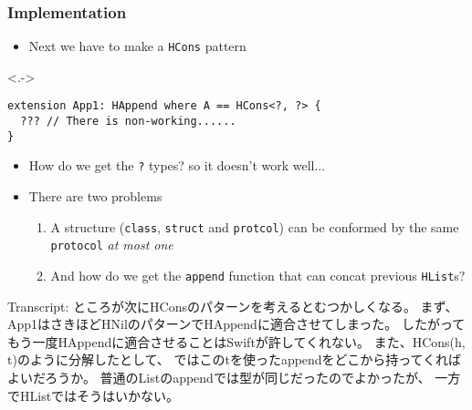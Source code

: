\begin{frame}[fragile]
  \frametitle{Implementation}

  \begin{itemize}
    \item<+-> Next we have to make a \lstinline|HCons| pattern
  \end{itemize}

  \begin{uncoverenv}<.->
\begin{lstlisting}[style=swift]
extension App1: HAppend where A == HCons<?, ?> {
  ??? // There is non-working......
}
\end{lstlisting}
  \end{uncoverenv}

  \begin{itemize}
    \item<+-> How do we get the \lstinline|?| types?
    so it doesn't work well...

    \item<+-> There are two problems
    \begin{enumerate}
      \item A structure (\lstinline|class|, \lstinline|struct| and \lstinline|protcol|)
      can be conformed by the same \lstinline|protocol| \emph{at most one}

      \item And how do we get the \lstinline|append| function
      that can concat previous \lstinline|HList|s?
    \end{enumerate}
  \end{itemize}
  
  \begin{notes}
    \item Transcript:
    ところが次にHConsのパターンを考えるとむつかしくなる。
    まず、App1はさきほどHNilのパターンでHAppendに適合させてしまった。
    したがってもう一度HAppendに適合させることはSwiftが許してくれない。
    また、HCons(h, t)のように分解したとして、
    ではこのtを使ったappendをどこから持ってくればよいだろうか。
    普通のListのappendでは型が同じだったのでよかったが、
    一方でHListではそうはいかない。
  \end{notes}
\end{frame}


